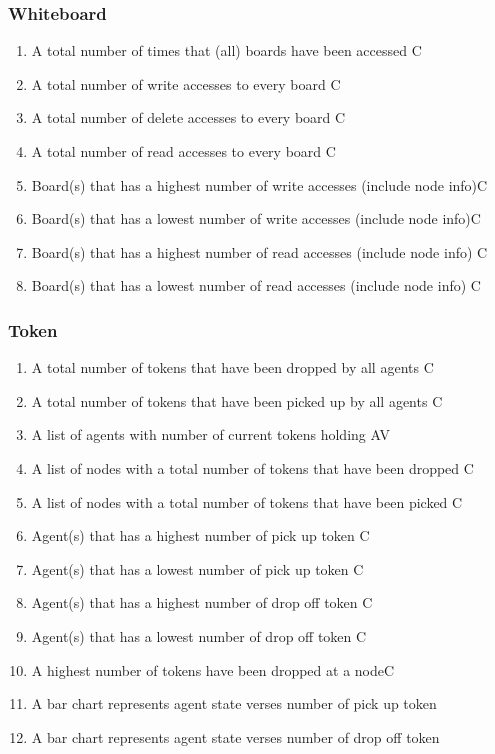 \subsubsection*{Whiteboard}
\begin{enumerate}
\item A total number of times that (all) boards have been accessed C
\item A total number of write accesses to every board C
\item A total number of delete accesses to every board C
\item A total number of read accesses to every board C
\item Board(s) that has a highest number of write accesses (include node info)C
\item Board(s) that has a lowest number of write accesses (include node info)C
\item Board(s) that has a highest number of read accesses (include node info) C
\item Board(s) that has a lowest number of read accesses (include node info)  C
\end{enumerate}


\subsubsection*{Token}
\begin{enumerate}
\item A total number of tokens that have been dropped by all agents C
\item A total number of tokens that have been picked up by all agents C
\item A list of agents with number of current tokens holding AV
\item A list of nodes with a total number of tokens that have been dropped C
\item A list of nodes with a total number of tokens that have been picked C

\item Agent(s) that has a highest number of pick up token C
\item Agent(s) that has a lowest number of pick up token C
\item Agent(s) that has a highest number of drop off token C
\item Agent(s) that has a lowest number of drop off token C
\item A highest number of tokens have been dropped at a nodeC

\item A bar chart represents agent state verses number of pick up token
\item A bar chart represents agent state verses number of drop off token
\end{enumerate}


